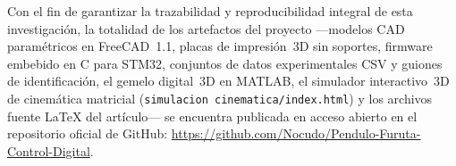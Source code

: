 Con el fin de garantizar la trazabilidad y reproducibilidad integral de esta investigación, la totalidad de los artefactos del proyecto ---modelos CAD paramétricos en FreeCAD~1.1, placas de impresión~3D sin soportes, firmware embebido en C para STM32, conjuntos de datos experimentales CSV y guiones de identificación, el gemelo digital~3D en MATLAB, el simulador interactivo~3D de cinemática matricial (\texttt{simulacion cinematica/\allowbreak index.html}) y los archivos fuente LaTeX del artículo--- se encuentra publicada en acceso abierto en el repositorio oficial de GitHub: \url{https://github.com/Nocudo/Pendulo-Furuta-Control-Digital}.
